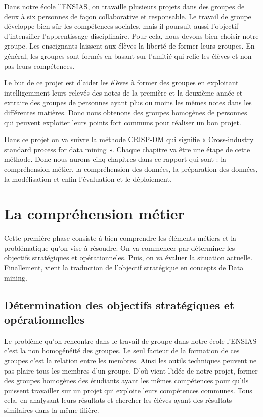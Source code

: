 \documentclass{article}
\begin{document}
    \begin{spacing}{2}
    \par Dans notre école l’ENSIAS, on travaille plusieurs projets dans des groupes de deux à six personnes de façon collaborative et responsable. Le travail de groupe développe bien sûr les compétences sociales, mais il poursuit aussi l’objectif d’intensifier l’apprentissage disciplinaire. Pour cela, nous devons bien choisir notre groupe. Les enseignants laissent aux élèves la liberté de former leurs groupes. En général, les groupes sont formés en basant sur l’amitié qui relie les élèves et non pas leurs compétences.
    \par Le but de ce projet est d’aider les élèves à former des groupes en exploitant intelligemment leurs relevés des notes de la première et la deuxième année et extraire des groupes de personnes ayant plus ou moins les mêmes notes dans les différentes matières. Donc nous obtenons des groupes homogènes de personnes qui peuvent exploiter leurs points fort communs pour réaliser un bon projet.
    \par Dans ce projet on va suivre la méthode CRISP-DM qui signifie « Cross-industry standard process for data mining ». Chaque chapitre va être une étape de cette méthode. Donc nous aurons cinq chapitres dans ce rapport qui sont : la compréhension métier, la compréhension des données, la préparation des données, la  modélisation et enfin l’évaluation et le déploiement.
    \end{spacing}
    \newpage
        \section{La compréhension métier}
            Cette première phase consiste à bien comprendre les éléments métiers et la problématique qu’on vise à résoudre. On va commencer par déterminer les objectifs stratégiques et opérationneles. Puis, on va évaluer la situation actuelle. Finallement, vient la traduction de l’objectif stratégique en concepts de Data mining.\\
            \subsection{Détermination des objectifs stratégiques et opérationnelles}
                Le problème qu’on rencontre dans le travail de groupe dans notre école l’ENSIAS c’est la non homogénéité des groupes. Le seul facteur de la formation de ces groupes c’est la relation entre les membres. Ainsi les outils techniques peuvent ne pas plaire tous les membres d’un groupe. D’où vient l’idée de notre projet, former des groupes homogènes des étudiants ayant les mêmes compétences pour qu’ils puissent travailler sur un projet qui exploite leurs compétences communes. Tous cela, en analysant leurs résultats et chercher les élèves ayant des résultats similaires dans la même filière.\\
\end{document}
